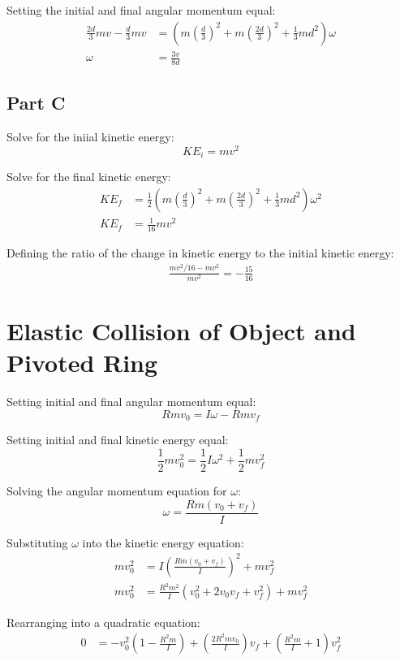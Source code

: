 \documentclass{article}
\begin{document}
Setting the initial and final angular momentum equal:
\begin{align*}
    \frac{2 d}{3} m v - \frac{d}{3} m v &= \left( m \left( \frac{d}{3} \right)^2
    + m \left( \frac{2 d}{3} \right)^2 + \frac{1}{3} m d^2 \right) \omega \\
    \omega &= \frac{3 v}{8 d}
\end{align*}

\subsection*{Part C}

Solve for the iniial kinetic energy:
$$KE_i = m v^2$$

Solve for the final kinetic energy:
\begin{align*}
    KE_f &= \frac{1}{2} \left( m \left( \frac{d}{3} \right)^2 + m \left( \frac{2 d}{3}
    \right)^2 + \frac{1}{3} m d^2 \right) \omega^2 \\
    KE_f &= \frac{1}{16} m v^2
\end{align*}

Defining the ratio of the change in kinetic energy to the initial kinetic
energy:
\begin{align*}
    \frac{ m v^2/16 - m v^2}{m v^2} = -\frac{15}{16}
\end{align*}

\section{Elastic Collision of Object and Pivoted Ring}

Setting initial and final angular momentum equal:
$$R m v_0 = I \omega - R m v_f$$

Setting initial and final kinetic energy equal:
$$\frac{1}{2} m v_0^2 = \frac{1}{2} I \omega^2 + \frac{1}{2} m v_f^2$$

Solving the angular momentum equation for $\omega$:
$$\omega = \frac{R m (v_0 + v_f)}{I}$$

Substituting $\omega$ into the kinetic energy equation:
\begin{align*}
    m v_0^2 &= I \left( \frac{R m (v_0 + v_f)}{I} \right)^2 + m v_f^2 \\
    m v_0^2 &= \frac{ R^2 m^2 }{I} \left( v_0^2 + 2 v_0 v_f + v_f^2 \right) + m
    v_f^2
\end{align*}

Rearranging into a quadratic equation:
\begin{align*}
    0 &= -v_0^2 \left( 1 - \frac{R^2 m}{I} \right) + \left( \frac{2 R^2 m
    v_0}{I} \right) v_f + \left( \frac{R^2 m}{I} + 1 \right) v_f^2
\end{align*}
\end{document}
